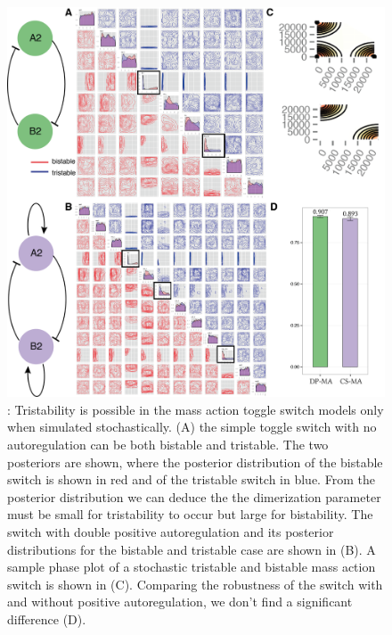 \begin{figure}[h]
\begin{center}
\includegraphics[scale=0.6]{chapterStabilityFinder/images/figure-07.png}
\caption[LoF caption]{ \label{fig:fig7}: Tristability is possible in the mass action toggle switch models only when simulated stochastically. (A) the simple toggle switch with no autoregulation can be both bistable and tristable. The two posteriors are shown, where the posterior distribution of the bistable switch is shown in red and of the tristable switch in blue. From the posterior distribution we can deduce the the dimerization parameter must be small for tristability to occur but large for bistability. The switch with double positive autoregulation and its posterior distributions for the bistable and tristable case are shown in (B). A sample phase plot of a stochastic tristable and bistable mass action switch is shown in (C). Comparing the robustness of the switch with and without positive autoregulation, we don't find a significant difference (D).}
\end{center}
\end{figure}
\clearpage

